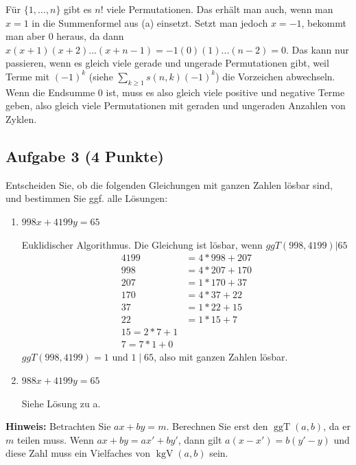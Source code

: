 \documentclass{article} %
\begin{document}
\begin{enumerate}
        \begin{mybox}
    Für $\{1, \dots, n\}$ gibt es $n!$ viele Permutationen. Das erhält man auch, wenn man $x=1$ in die Summenformel aus (a) einsetzt. Setzt man jedoch $x= -1$, bekommt man aber $0$ heraus, da dann $x(x+1)(x+2)...(x+n-1) = -1(0)(1)...(n-2) = 0$. Das kann nur passieren, wenn es gleich viele gerade und ungerade Permutationen gibt, weil Terme mit $(-1)^k$ (siehe  $\sum_{k \geq 1} s(n, k)(-1)^k$) die Vorzeichen abwechseln. Wenn die Endsumme $0$ ist, muss es also gleich viele positive und negative Terme geben, also gleich viele Permutationen mit geraden und ungeraden Anzahlen von Zyklen. 
        \end{mybox}
    \end{enumerate}

    \subsection*{Aufgabe 3 (4 Punkte)} 
    Entscheiden Sie, ob die folgenden Gleichungen mit ganzen Zahlen lösbar sind, und bestimmen Sie ggf. alle Lösungen:
    \begin{enumerate}
        \item[(a)] $998x + 4199y = 65$
        \begin{mybox}
        Euklidischer Algorithmus. Die Gleichung ist lösbar, wenn $ggT(998,4199) | 65$
        \begin{align*}
            4199 &= 4 * 998 + 207 \\
            998 &= 4 * 207 + 170 \\
            207 &= 1 * 170 + 37 \\
            170 &= 4 * 37 + 22 \\
            37 &= 1 * 22 + 15 \\
            22 &= 1*15 + 7 \\
            15 = 2*7 + 1 \\
            7 = 7*1 + 0
        \end{align*}
        $ggT(998,4199)  = 1$ und $1 \mid 65$, also mit ganzen Zahlen lösbar.
        \end{mybox}
        \item[(b)] $988x + 4199y = 65$
        \begin{mybox}
        Siehe Lösung zu a. 
        \end{mybox}
    \end{enumerate}
    \textbf{Hinweis:} Betrachten Sie $ax + by = m$. Berechnen Sie erst den $\operatorname{ggT}(a, b)$, da er $m$ teilen muss. Wenn $ax + by = ax' + by'$, dann gilt $a(x - x') = b(y' - y)$ und diese Zahl muss ein Vielfaches von $\operatorname{kgV}(a, b)$ sein.
\end{document}
